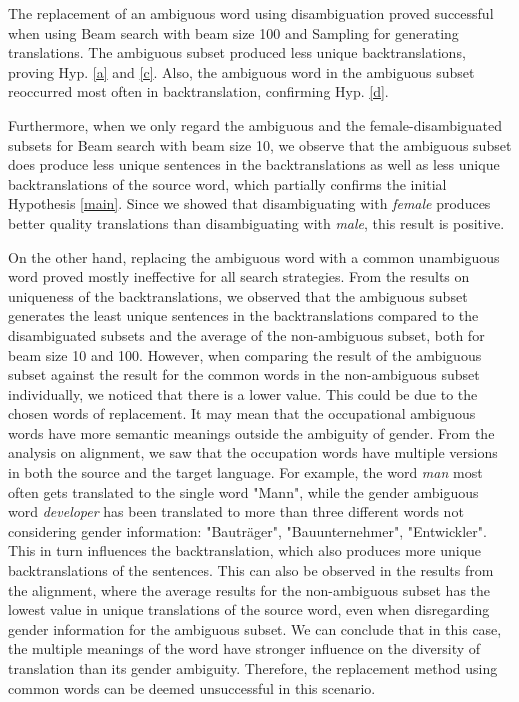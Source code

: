 The replacement of an ambiguous word using disambiguation proved successful when using Beam search with beam size 100 and Sampling for generating translations. The ambiguous subset produced less unique backtranslations, proving Hyp. \ref{a} and \ref{c}. Also, the ambiguous word in the ambiguous subset reoccurred most often in backtranslation, confirming Hyp. \ref{d}.

Furthermore, when we only regard the ambiguous and the female-disambiguated subsets for Beam search 
with beam size 10, we observe that the ambiguous subset does produce less unique sentences in the backtranslations as well as less unique backtranslations of the source word, which partially confirms the initial Hypothesis \ref{main}. Since we showed that disambiguating with \textit{female} produces better quality translations than disambiguating with \textit{male}, this result is positive.

On the other hand, replacing the ambiguous word with a common unambiguous word proved mostly ineffective for all search strategies. From the results on uniqueness of the backtranslations, we observed that the ambiguous subset generates the least unique sentences in the backtranslations compared to the disambiguated subsets and the average of the non-ambiguous subset, both for beam size 10 and 100. However, when comparing the result of the ambiguous subset against the result for the common words in the non-ambiguous subset individually, we noticed that there is a lower value. This could be due to the chosen words of replacement. It may mean that the occupational ambiguous words have more semantic meanings outside the ambiguity of gender. From the analysis on alignment, we saw that the occupation words have multiple versions in both the source and the target language. For example, the word \textit{man} most often gets translated to the single word "Mann", while the gender ambiguous word \textit{developer} has been translated to more than three different words not considering gender information: "Bauträger", "Bauunternehmer", "Entwickler". This in turn influences the backtranslation, which also produces more unique backtranslations of the sentences. This can also be observed in the results from the alignment, where the average results for the non-ambiguous subset has the lowest value in unique translations of the source word, even when disregarding gender information for the ambiguous subset. We can conclude that in this case, the multiple meanings of the word have stronger influence on the diversity of translation than its gender ambiguity. Therefore, the replacement method using common words can be deemed unsuccessful in this scenario.

